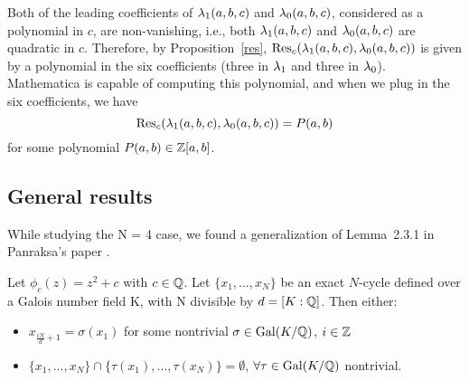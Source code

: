 \begin{case}
  Both of the leading coefficients of $\lambda_1(a, b, c)$ and $\lambda_0(a, b,
  c)$, considered as a polynomial in $c$, are non-vanishing, i.e.,
  both $\lambda_1(a, b, c)$ and $\lambda_0(a, b, c)$ are quadratic in
  $c$. Therefore, by Proposition~\ref{res}, $\mathrm{Res}_c(\lambda_1(a, b, c),
  \lambda_0(a, b, c))$ is given by a polynomial in the six coefficients
  (three in $\lambda_1$ and three in $\lambda_0$). Mathematica is capable of
  computing this polynomial, and when we plug in the six coefficients,
  we have
  \[
  \mathrm{Res}_c(\lambda_1(a, b, c), \lambda_0(a, b, c)) = P(a, b)
  \]
  for some polynomial $P(a, b) \in \mathbb{Z}[a, b]$.
\end{case}

\subsection{General results}

While studying the N = 4 case, we found a generalization of Lemma~2.3.1
in Panraksa's paper \cite{MR2982105}.

\begin{theorem}
	Let $\phi_c(z) = z^2 + c$ with $c \in \mathbb{Q}$. Let $\{x_1, \ldots, x_{N}\}$ be
	an exact $N$-cycle defined over a Galois number field K, with N 
	divisible by	$d = [K:\mathbb{Q} ]$. Then either: \\
	\begin{itemize}
	\item $x_{\frac{iN}{d}+1} = \sigma(x_1)$ for some nontrivial $\sigma \in
	\mathrm{Gal}(K/\mathbb{Q})$, $i \in \mathbb{Z}$
	\item $\{x_1, \ldots, x_{N}\} \cap \{\tau(x_1), \ldots, \tau(x_{N})\} =
	\emptyset$, $\forall \tau \in \mathrm{Gal}(K/\mathbb{Q})$ nontrivial.
	\end{itemize}
\end{theorem}

